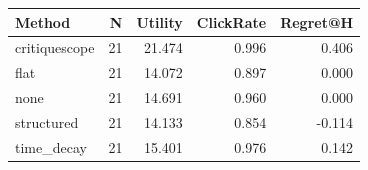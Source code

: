 \begin{tabular}{lrrrr}
\toprule
Method & N & Utility & ClickRate & Regret@H \\
\midrule
critiquescope & 21 & 21.474 & 0.996 & 0.406 \\
flat & 21 & 14.072 & 0.897 & 0.000 \\
none & 21 & 14.691 & 0.960 & 0.000 \\
structured & 21 & 14.133 & 0.854 & -0.114 \\
time_decay & 21 & 15.401 & 0.976 & 0.142 \\
\bottomrule
\end{tabular}
